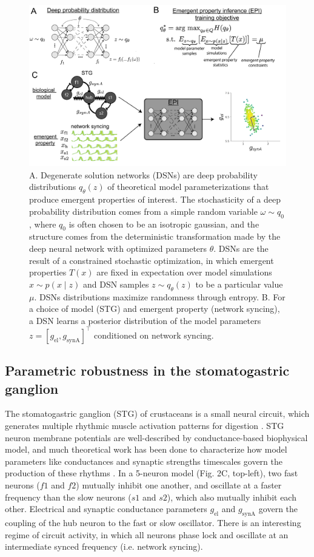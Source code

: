 \documentclass[11pt]{article}
\begin{document}
\begin{figure}
\begin{center}
\includegraphics[scale=0.4]{figs/fig2/fig2.pdf}
\end{center}
\caption{A. Degenerate solution networks (DSNs) are deep probability distributions $q_\theta(z)$ of theoretical model parameterizations that produce emergent properties of interest.  The stochasticity of a deep probability distribution comes from a simple random variable $\omega \sim q_0$, where $q_0$ is often chosen to be an isotropic gaussian, and the structure comes from the deterministic transformation made by the deep neural network with optimized parameters $\theta$.  DSNs are the result of a constrained stochastic optimization, in which emergent properties $T(x)$ are fixed in expectation over model simulations $x \sim p(x \mid z)$ and DSN samples $z \sim q_\theta(z)$ to be a particular value $\mu$.  DSNs distributions maximize randomness through entropy. B. For a choice of model (STG) and emergent property (network syncing), a DSN learns a posterior distribution of the model parameters  $z = \left[g_{\text{el}}, g_{\text{synA}} \right]^\top$ conditioned on network syncing.}
\end{figure}

\subsection{Parametric robustness in the stomatogastric ganglion}
The stomatogastric ganglion (STG) of crustaceans is a small neural circuit, which generates multiple rhythmic muscle activation patterns for digestion \cite{marder}. STG neuron membrane potentials are well-described by conductance-based biophysical model, and much theoretical work has been done to characterize how model parameters like conductances and synaptic strengths timescales govern the production of these rhythms \cite{more marder}.  In a 5-neuron model \cite{gutierrez2013multiple} (Fig. 2C, top-left),  two fast neurons ($f1$ and $f2$) mutually inhibit one another, and oscillate at a faster frequency than the slow neurons ($s1$ and $s2$), which also mutually inhibit each other.  Electrical and synaptic conductance parameters $g_{\text{el}}$ and $g_{\text{synA}}$ govern the coupling of the hub neuron to the fast or slow oscillator.  There is an interesting regime of circuit activity, in which all neurons phase lock and oscillate at an intermediate synced frequency (i.e. network syncing). 
\end{document}
